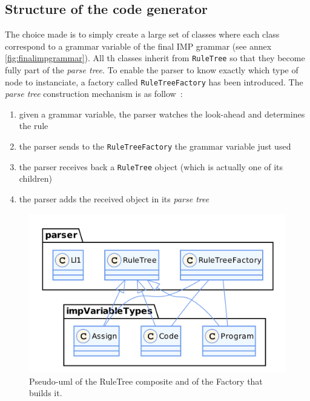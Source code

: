 \documentclass[a4paper,11pt]{article}
\begin{document}
  \subsection{Structure of the code generator}
    The choice made is to simply create a large set of classes where each class correspond to a grammar variable of the final IMP grammar (see annex \ref{fig:finalimpgrammar}). All th classes inherit from \verb|RuleTree| so that they become fully part of the \textit{parse tree}. To enable the parser to know exactly which type of node to instanciate, a factory called \verb|RuleTreeFactory| has been introduced. The \textit{parse tree} construction mechanism is as follow~:
    \begin{enumerate}
      \item given a grammar variable, the parser watches the look-ahead and determines the rule
      \item the parser sends to the \verb|RuleTreeFactory| the grammar variable just used
      \item the parser receives back a \verb|RuleTree| object (which is actually one of its children)
      \item the parser adds the received object in its \textit{parse tree}
    \end{enumerate}
    \begin{figure}[h!]
      \centering
      \includegraphics[scale=0.175]{img/class_ruleTree.png}
      \caption{Pseudo-uml of the RuleTree composite and of the Factory that builds it.}
    \end{figure}

  
\end{document}
